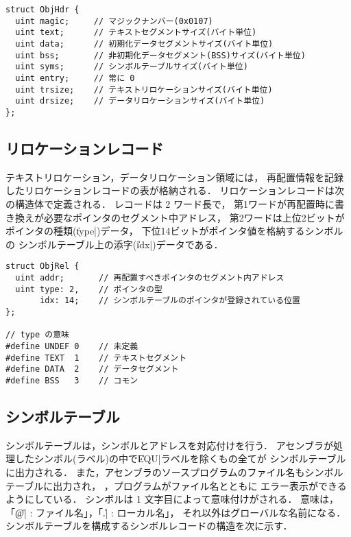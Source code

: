 \begin{lstlisting}[numbers=none,float=htb]
struct ObjHdr {
  uint magic;     // マジックナンバー(0x0107)
  uint text;      // テキストセグメントサイズ(バイト単位)
  uint data;      // 初期化データセグメントサイズ(バイト単位)
  uint bss;       // 非初期化データセグメント(BSS)サイズ(バイト単位)
  uint syms;      // シンボルテーブルサイズ(バイト単位)
  uint entry;     // 常に 0
  uint trsize;    // テキストリロケーションサイズ(バイト単位)
  uint drsize;    // データリロケーションサイズ(バイト単位)
};
\end{lstlisting}

\subsection{リロケーションレコード}
テキストリロケーション，データリロケーション領域には，
再配置情報を記録したリロケーションレコードの表が格納される．
リロケーションレコードは次の構造体で定義される．
レコードは 2 ワード長で，
第1ワードが再配置時に書き換えが必要なポインタのセグメント中アドレス，
第2ワードは上位2ビットがポインタの種類(\|type|)データ，
下位14ビットがポインタ値を格納するシンボルの
シンボルテーブル上の添字(\|idx|)データである．

\begin{lstlisting}[numbers=none,float=htb]
struct ObjRel {
  uint addr;       // 再配置すべきポインタのセグメント内アドレス
  uint type: 2,    // ポインタの型
       idx: 14;    // シンボルテーブルのポインタが登録されている位置
};

// type の意味
#define UNDEF 0    // 未定義
#define TEXT  1    // テキストセグメント
#define DATA  2    // データセグメント
#define BSS   3    // コモン
\end{lstlisting}

\subsection{シンボルテーブル}
シンボルテーブルは，シンボルとアドレスを対応付けを行う．
アセンブラが処理したシンボル(ラベル)の中で\|EQU|ラベルを除くもの全てが
シンボルテーブルに出力される．
また，アセンブラのソースプログラムのファイル名もシンボルテーブルに出力され，
{\objexe}，{\objbin}プログラムがファイル名とともに
エラー表示ができるようにしている．
シンボルは 1 文字目によって意味付けがされる．
意味は，「\|@| : ファイル名」，「\|.| : ローカル名」，
それ以外はグローバルな名前になる．
シンボルテーブルを構成するシンボルレコードの構造を次に示す．

